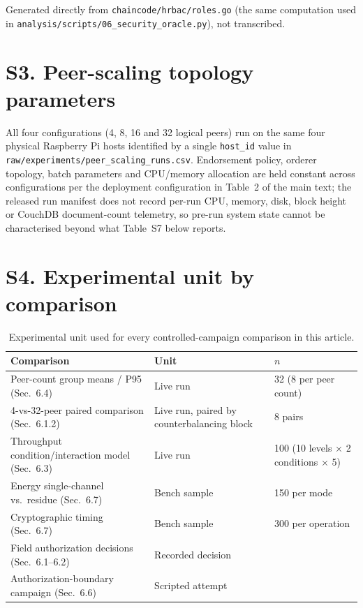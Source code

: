 \documentclass[11pt]{article}
\begin{document}
Generated directly from \texttt{chaincode/hrbac/roles.go} (the same computation used in \texttt{analysis/scripts/06\_security\_oracle.py}), not transcribed.

\begin{center}

\end{center}

\section*{S3. Peer-scaling topology parameters}

All four configurations (4, 8, 16 and 32 logical peers) run on the same four physical Raspberry Pi hosts identified by a single \texttt{host\_id} value in \texttt{raw/experiments/peer\_scaling\_runs.csv}. Endorsement policy, orderer topology, batch parameters and CPU/memory allocation are held constant across configurations per the deployment configuration in Table~2 of the main text; the released run manifest does not record per-run CPU, memory, disk, block height or CouchDB document-count telemetry, so pre-run system state cannot be characterised beyond what Table~S7 below reports.

\section*{S4. Experimental unit by comparison}

\begin{table}[h]
\centering
\caption{Experimental unit used for every controlled-campaign comparison in this article.}
\label{tab:s4}
\small
\begin{tabular}{p{5.2cm}p{4.6cm}p{3.0cm}}
\toprule
Comparison & Unit & $n$ \\
\midrule
Peer-count group means / P95 (Sec.~6.4) & Live run & 32 (8 per peer count) \\
4-vs-32-peer paired comparison (Sec.~6.1.2) & Live run, paired by counterbalancing block & 8 pairs \\
Throughput condition/interaction model (Sec.~6.3) & Live run & 100 (10 levels $\times$ 2 conditions $\times$ 5) \\
Energy single-channel vs.\ residue (Sec.~6.7) & Bench sample & 150 per mode \\
Cryptographic timing (Sec.~6.7) & Bench sample & 300 per operation \\
Field authorization decisions (Sec.~6.1--6.2) & Recorded decision & \AuthDecisions{} \\
Authorization-boundary campaign (Sec.~6.6) & Scripted attempt & \SecurityAttemptsTotal{} \\
\bottomrule
\end{tabular}
\end{table}
\end{document}
